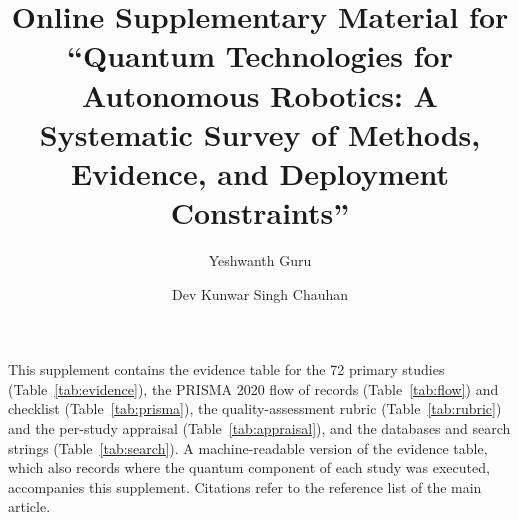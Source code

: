 \documentclass[acmsmall,screen,review]{acmart}
\begin{document}
\title{Online Supplementary Material for ``Quantum Technologies for Autonomous Robotics: A Systematic Survey of Methods, Evidence, and Deployment Constraints''}
\author{Yeshwanth Guru}
\author{Dev Kunwar Singh Chauhan}
\maketitle
This supplement contains the evidence table for the 72 primary studies (Table~\ref{tab:evidence}), the PRISMA 2020 flow of records (Table~\ref{tab:flow}) and checklist (Table~\ref{tab:prisma}), the quality-assessment rubric (Table~\ref{tab:rubric}) and the per-study appraisal (Table~\ref{tab:appraisal}), and the databases and search strings (Table~\ref{tab:search}). A machine-readable version of the evidence table, which also records where the quantum component of each study was executed, accompanies this supplement. Citations refer to the reference list of the main article.
\end{document}
